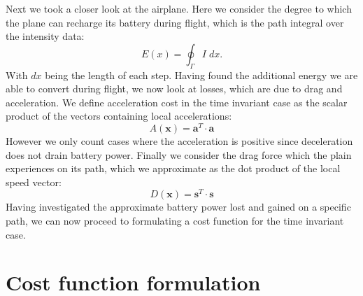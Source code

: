 \documentclass[ twoside,openright,titlepage,numbers=noenddot,headinclude,%
                footinclude=true,cleardoublepage=empty,abstractoff, %
                BCOR=5mm,paper=a4,fontsize=11pt,%
                ngerman,american,%
                ]{scrreprt}
\begin{document}
Next we took a closer look at the airplane. Here we consider the degree to which the plane can recharge its battery during flight, which is the path integral over the intensity data:
\begin{equation} \label{eqn:sunNotime}
E(x) = \oint_{\Gamma} I  \; dx.
\end{equation}
With $dx$ being the length of each step. Having found the additional energy we are able to convert during flight, we now look at losses, which are due to drag and acceleration. We define acceleration cost in the time invariant case as the scalar product of the vectors containing local accelerations:
\begin{equation}
A(\mathbf{x}) = \mathbf{a}^T \cdot \mathbf{a}
\end{equation}
 However we only count cases where the acceleration is positive since deceleration does not drain battery power.
Finally we consider the drag force which the plain experiences on its path, which we approximate as the dot product of the local speed vector:
\begin{equation}
D(\mathbf{x}) = \mathbf{s}^T \cdot \mathbf{s}
\end{equation}
Having investigated the approximate battery power lost and gained on a specific path, we can now proceed to formulating a cost function for the time invariant case.

\section{Cost function formulation}
\end{document}
